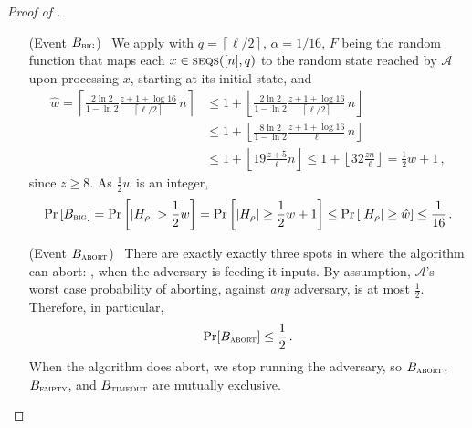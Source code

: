 \documentclass[10pt,a4paper]{article}
\theoremstyle{definition}
\theoremstyle{remark}
\newcommand{\cA}{\mathcal{A}}
\newcommand{\ceil}[1]{{\left\lceil{#1}\right\rceil}}
\newcommand{\floor}[1]{{\left\lfloor{#1}\right\rfloor}}
\newcommand{\unsafesc}{\textsc{unsafe}\xspace}
\newcommand{\emptysc}{\textsc{empty}\xspace}
\newcommand{\timeoutsc}{\textsc{timeout}\xspace}
\newcommand{\bigsc}{\textsc{big}\xspace}
\newcommand{\abort}{\textsc{abort}\xspace}
\newcommand{\abortsc}{\textsc{abort}\xspace}
\newcommand{\rl}{\mathbf{\ell}}             %
\newcommand{\SSD}[2]{\textsc{seqs}(#1,#2)}  %
\newcommand{\Mstk}{\Delta}                  %
\begin{document}
\begin{itemize}
\begin{itemize}
\begin{proof}[Proof of ]
\begin{itemize}
\begin{itemize}[wide, font=\bfseries]
    If $\Pr[B_{\unsafesc}] > 1/(16)$, we then have
    $\Mstk(n,\rl,\frac{1}{2},z) \ge \rl/(2^7 n)$, which implies
    \cref{eq:mif-rt-lb-step-err} leaving nothing more to prove. Therefore, for
    the rest of this proof we will consider the case in which
    \begin{align}
      \Pr[B_{\unsafesc}] \le \frac{1}{16} \,.
      \label{eq:b-unsafe-bound}
    \end{align}

  \item[(Event $B_{\bigsc}$)~]
    We apply  with $q = \ceil{\rl/2}$, $\alpha =
    1/16$, $F$ being the random function that maps each $x \in
    \SSD{[n]}{q}$ to the random state reached by $\cA$ upon processing $x$,
    starting at its initial state, and
    \begin{align*}
      \hat{w} = \ceil{\frac{2\ln2}{1-\ln2} \frac{z+1+\log 16}{\ceil{\rl/2}}\, n} 
        &\le 1 + \floor{\frac{2\ln2}{1-\ln2} \frac{z+1+\log 16}{\ceil{\rl/2}}\, n} \\
        &\le 1 + \floor{\frac{8 \ln 2}{1 - \ln 2} \frac{z + 1 + \log 16}{\rl}\, n} \\
        &\le 1 + \floor{19 \frac{z + 5}{\rl} n} 
          \le 1 + \floor{32 \frac{z n}{\rl}} = \frac{1}{2} w + 1 \,,
    \end{align*}
    since $z \ge 8$. As $\frac{1}{2} w$ is an integer,
    \begin{align}
      \Pr\left[B_{\bigsc}\right]
      = \Pr\left[|H_\rho| > \frac{1}{2} w\right] 
      = \Pr\left[|H_\rho| \ge \frac{1}{2} w + 1\right] 
      \le \Pr\left[|H_\rho| \ge \hat{w}\right] 
      \le \frac{1}{16} \,.
      \label{eq:b-big-bound}
    \end{align}
    
  \item[(Event $B_{\abort}$)~] 
    There are exactly exactly three spots in 
    where the algorithm can abort:
    , when the
    adversary is feeding it inputs.  By assumption, $\cA$'s worst case
    probability of aborting, against {\em any} adversary, is at most
    $\frac12$. Therefore, in particular,
    \begin{align}
      \Pr[B_{\abort}] \le \frac{1}{2} \,.
      \label{eq:b-abort-bound}
    \end{align}
    When the algorithm does abort, we stop running the adversary, so
    $B_{\abortsc}$, $B_{\emptysc}$, and $B_{\timeoutsc}$ are mutually exclusive.
    

\end{itemize}
\end{itemize}
\end{proof}
\end{itemize}
\end{itemize}
\end{document}
